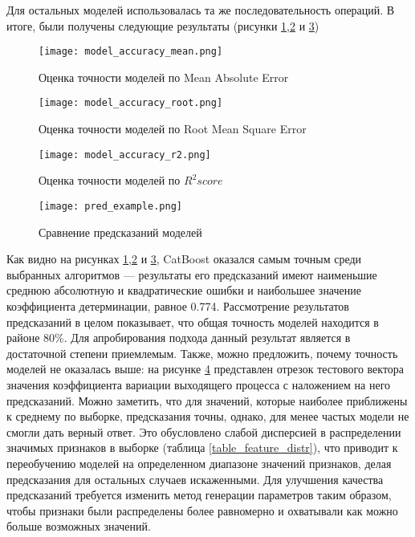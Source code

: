 Для остальных моделей использовалась та же последовательность операций. В итоге, были получены следующие результаты (рисунки \ref{model_accuracy_mean},\ref{model_accuracy_root} и \ref{model_accuracy_r2})
\begin{figure}[H]
	\centering
	\texttt{[image: model\_accuracy\_mean.png]}
	\caption{Оценка точности моделей по Mean Absolute Error}
	\label{model_accuracy_mean}
\end{figure}
\begin{figure}[H]
	\centering
	\texttt{[image: model\_accuracy\_root.png]}
	\caption{Оценка точности моделей по Root Mean Square Error}
	\label{model_accuracy_root}
\end{figure}
\begin{figure}[H]
	\centering
	\texttt{[image: model\_accuracy\_r2.png]}
	\caption{Оценка точности моделей по $R^2 score$}
	\label{model_accuracy_r2}
\end{figure}
\begin{figure}[H]
	\centering
	\texttt{[image: pred\_example.png]}
	\caption{Сравнение предсказаний моделей}
	\label{pred_example}
\end{figure}
Как видно на рисунках \ref{model_accuracy_mean},\ref{model_accuracy_root} и \ref{model_accuracy_r2}, CatBoost оказался самым точным среди выбранных алгоритмов --- результаты его предсказаний имеют наименьшие среднюю абсолютную и квадратические ошибки и наибольшее значение коэффициента детерминации, равное 0.774. Рассмотрение результатов предсказаний в целом показывает, что общая точность моделей находится в районе 80\%. Для апробирования подхода данный результат является в достаточной степени приемлемым. Также, можно предложить, почему точность моделей не оказалась выше: на рисунке \ref{pred_example} представлен отрезок тестового вектора значения коэффициента вариации выходящего процесса с наложением на него предсказаний. Можно заметить, что для значений, которые наиболее приближены к среднему по выборке, предсказания точны, однако, для менее частых модели не смогли дать верный ответ. Это обусловлено слабой дисперсией в распределении значимых признаков в выборке (таблица \ref{table_feature_distr}), что приводит к переобучению моделей на определенном диапазоне значений признаков, делая предсказания для остальных случаев искаженными. Для улучшения качества предсказаний требуется изменить метод генерации параметров таким образом, чтобы признаки были распределены более равномерно и охватывали как можно больше возможных значений.
\clearpage